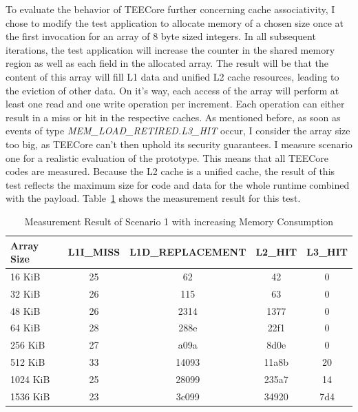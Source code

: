 To evaluate the behavior of TEECore further concerning cache associativity, I
chose to modify the test application to allocate memory of a chosen size once at
the first invocation for an array of 8 byte sized integers. In all subsequent
iterations, the test application will increase the counter in the shared memory
region as well as each field in the allocated array. The result will be that the
content of this array will fill L1 data and unified L2 cache resources, leading
to the eviction of other data. On it's way, each access of the array will
perform at least one read and one write operation per increment. Each operation
can either result in a miss or hit in the respective caches. As mentioned
before, as soon as events of type \textit{MEM\_LOAD\_RETIRED.L3\_HIT} occur, I
consider the array size too big, as TEECore can't then uphold its security
guarantees. I measure scenario one for a realistic evaluation of the prototype.
This means that all TEECore codes are measured. Because the L2 cache is a
unified cache, the result of this test reflects the maximum size for code and
data for the whole runtime combined with the payload. Table~\ref{50:tab:size}
shows the measurement result for this test.

\begin{table}[ht]
    \centering
    \begin{tabular}{ |l||c|c|c|c| }
        \hline
        Array Size & L1I\_MISS & L1D\_REPLACEMENT & L2\_HIT & L3\_HIT \\
        \hline
        16 KiB     & 25        & 62               & 42      & 0       \\
        32 KiB     & 26        & 115              & 63      & 0       \\
        48 KiB     & 26        & 2314             & 1377    & 0       \\
        64 KiB     & 28        & 288e             & 22f1    & 0       \\
        256 KiB    & 27        & a09a             & 8d0e    & 0       \\
        512 KiB    & 33        & 14093            & 11a8b   & 20      \\
        1024 KiB   & 25        & 28099            & 235a7   & 14      \\
        1536 KiB   & 23        & 3c099            & 34920   & 7d4     \\
        \hline
    \end{tabular}
    \caption{Measurement Result of Scenario 1 with increasing Memory Consumption}
    \label{50:tab:size}
\end{table}

